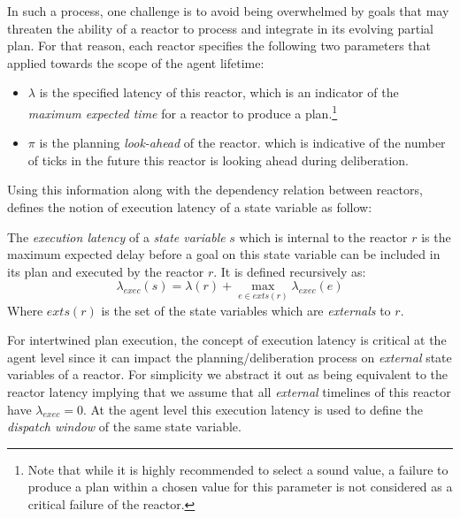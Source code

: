 In such a process, one challenge is to avoid being overwhelmed by
goals that may threaten the ability of a reactor to process and
integrate in its evolving partial plan. For that reason, each reactor
specifies the following two parameters that applied towards the scope
of the agent lifetime:

\begin{itemize}

\item $\lambda$ is the specified latency of this reactor, which is an
  indicator of the \emph{maximum expected time} for a reactor to
  produce a plan.\footnote{Note that while it is highly recommended to
    select a sound value, a failure to produce a plan within a chosen
    value for this parameter is not considered as a critical failure
    of the reactor.}

\item $\pi$ is the planning \emph{look-ahead} of the reactor. which is
  indicative of the number of ticks in the future this reactor is
  looking ahead during deliberation.

\end{itemize}

Using this information along with the dependency relation between
reactors, \rx defines the notion of execution latency of a state
variable as follow:

\begin{definition}
  The {\em execution latency} of a {\em state variable} $s$ which is
  internal to the reactor $r$ is the maximum expected delay before a
  goal on this state variable can be included in its plan and executed
  by the reactor $r$. It is defined recursively as: 
  \begin{equation*}
    \lambda_{exec}(s) = \lambda(r) + \max_{e \in exts(r)}
    \lambda_{exec}(e) 
  \end{equation*}
  Where  $exts(r)$ is the set of the state variables which are
  {\em externals} to $r$. 
\end{definition}

For intertwined plan execution, the concept of execution latency is
critical at the agent level since it can impact the
planning/deliberation process on {\em external} state variables of a
reactor. For simplicity we abstract it out as being equivalent to the
reactor latency implying that we assume that all {\em external}
timelines of this reactor have $\lambda_{exec} = 0$. At the \rx agent
level this execution latency is used to define the {\em dispatch
  window} of the same state variable.

